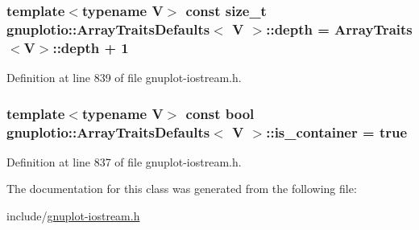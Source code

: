 \subsubsection[{\texorpdfstring{depth}{depth}}]{\setlength{\rightskip}{0pt plus 5cm}template$<$typename V$>$ const size\+\_\+t {\bf gnuplotio\+::\+Array\+Traits\+Defaults}$<$ V $>$\+::depth = {\bf Array\+Traits}$<$V$>$\+::depth + 1\hspace{0.3cm}{\ttfamily [static]}}\hypertarget{classgnuplotio_1_1_array_traits_defaults_ac51367f5da9096249b162af1496e36ab}{}\label{classgnuplotio_1_1_array_traits_defaults_ac51367f5da9096249b162af1496e36ab}


Definition at line 839 of file gnuplot-\/iostream.\+h.

\subsubsection[{\texorpdfstring{is\+\_\+container}{is_container}}]{\setlength{\rightskip}{0pt plus 5cm}template$<$typename V$>$ const bool {\bf gnuplotio\+::\+Array\+Traits\+Defaults}$<$ V $>$\+::is\+\_\+container = true\hspace{0.3cm}{\ttfamily [static]}}\hypertarget{classgnuplotio_1_1_array_traits_defaults_a57bab5bf3617f0ee66fdd4dcb751aa21}{}\label{classgnuplotio_1_1_array_traits_defaults_a57bab5bf3617f0ee66fdd4dcb751aa21}


Definition at line 837 of file gnuplot-\/iostream.\+h.



The documentation for this class was generated from the following file\+:\begin{DoxyCompactItemize}
\item 
include/\hyperlink{gnuplot-iostream_8h}{gnuplot-\/iostream.\+h}\end{DoxyCompactItemize}
